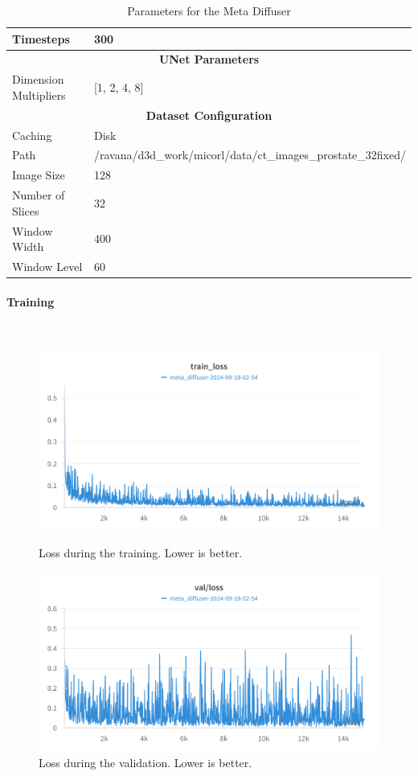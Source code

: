 \begin{table}[H]
\begin{tabular}{|l|l|}
\hline
Timesteps & 300 \\
\hline
\multicolumn{2}{|c|}{\textbf{UNet Parameters}} \\
\hline
Dimension Multipliers & [1, 2, 4, 8] \\
\hline
\multicolumn{2}{|c|}{\textbf{Dataset Configuration}} \\
\hline
Caching & Disk \\
\hline
Path & /ravana/d3d_work/micorl/data/ct_images_prostate_32fixed/ \\
\hline
Image Size & 128 \\
\hline
Number of Slices & 32 \\
\hline
Window Width & 400 \\
\hline
Window Level & 60 \\
\hline
\end{tabular}
\caption{Parameters for the Meta Diffuser}
\label{table:meta_diffuser_params}
\end{table}



\paragraph{Training}\mbox{}\\
\begin{figure}[H]
\includegraphics[width=\linewidth]{detailed_engineering/Meta Diffusion/charts/train_loss.png}
\caption{Loss during the training. Lower is better.}
\endminipage\hfill
{}
\includegraphics[width=\linewidth]{detailed_engineering/Meta Diffusion/charts/val_loss.png}
\caption{Loss during the validation. Lower is better.}
\endminipage
\end{figure}

